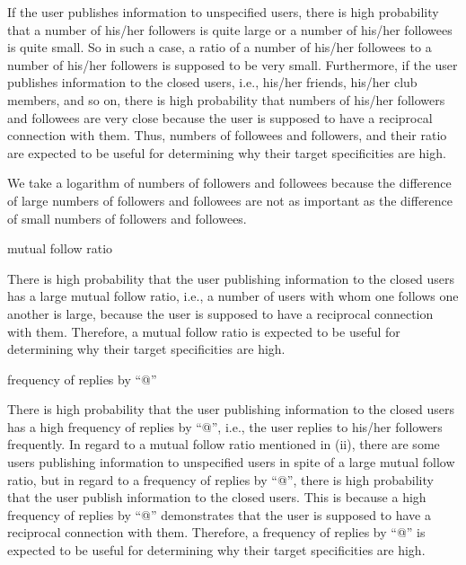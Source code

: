 If the user publishes information to unspecified users, there is high
probability that a number of his/her followers is quite large or a
number of his/her followees is quite small.  So in such a case, a ratio
of a number of his/her followees to a number of his/her followers is
supposed to be very small.  Furthermore, if the user publishes
information to the closed users, i.e., his/her friends, his/her club
members, and so on, there is high probability that numbers of his/her
followers and followees are very close because the user is supposed to
have a reciprocal connection with them.  Thus, numbers of followees and
followers, and their ratio are expected to be useful for determining why
their target specificities are high.

We take a logarithm of numbers of followers and followees because the
difference of large numbers of followers and followees are not as
important as the difference of small numbers of followers and followees.

\begin{description}
\bf {\item[(ii)] mutual follow ratio}
\end{description}

There is high probability that the user publishing information to the
closed users has a large mutual follow ratio, i.e., a number of users
with whom one follows one another is large, because the user is supposed
to have a reciprocal connection with them.  Therefore, a mutual follow
ratio is expected to be useful for determining why their target
specificities are high.

\begin{description}
\bf {\item[(iii)] frequency of replies by ``@''}
\end{description}

There is high probability that the user publishing information to the
closed users has a high frequency of replies by ``@'', i.e., the user
replies to his/her followers frequently. In regard to a mutual follow
ratio mentioned in (ii), there are some users publishing information to
unspecified users in spite of a large mutual follow ratio, but in regard
to a frequency of replies by ``@'', there is high probability that the
user publish information to the closed users.  This is because a high
frequency of replies by ``@'' demonstrates that the user is supposed to
have a reciprocal connection with them.  Therefore, a frequency of
replies by ``@'' is expected to be useful for determining why their
target specificities are high.

